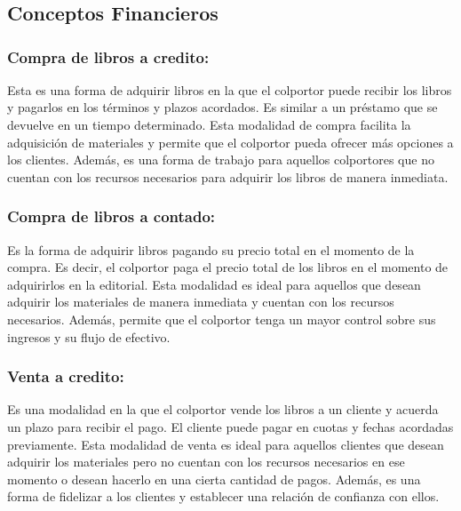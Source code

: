\documentclass[runningheads]{llncs}
\begin{document}
\section{}
\section{}

\subsection{Conceptos Financieros}
\subsubsection{Compra de libros a credito: }Esta es una forma de adquirir libros en la que el colportor puede recibir los libros y pagarlos en los términos y plazos acordados. Es similar a un préstamo que se devuelve en un tiempo determinado. Esta modalidad de compra facilita la adquisición de materiales y permite que el colportor pueda ofrecer más opciones a los clientes. Además, es una forma de trabajo para aquellos colportores que no cuentan con los recursos necesarios para adquirir los libros de manera inmediata.

\subsubsection{Compra de libros a contado: }Es la forma de adquirir libros pagando su precio total en el momento de la compra. Es decir, el colportor paga el precio total de los libros en el momento de adquirirlos en la editorial. Esta modalidad es ideal para aquellos que desean adquirir los materiales de manera inmediata y cuentan con los recursos necesarios. Además, permite que el colportor tenga un mayor control sobre sus ingresos y su flujo de efectivo.

\subsubsection{Venta a credito: }Es una modalidad en la que el colportor vende los libros a un cliente y acuerda un plazo para recibir el pago. El cliente puede pagar en cuotas y fechas acordadas previamente. Esta modalidad de venta es ideal para aquellos clientes que desean adquirir los materiales pero no cuentan con los recursos necesarios en ese momento o desean hacerlo en una cierta cantidad de pagos. Además, es una forma de fidelizar a los clientes y establecer una relación de confianza con ellos.
\end{document}
